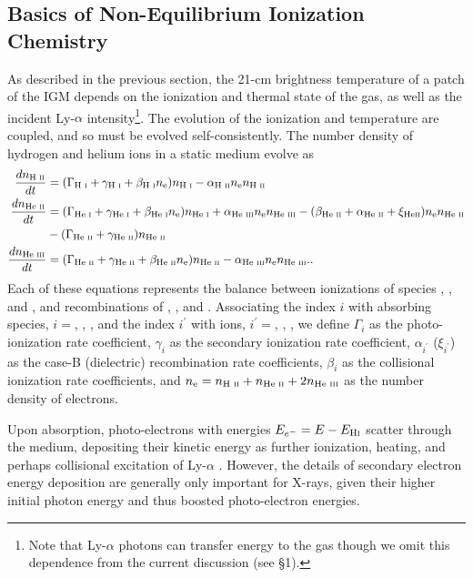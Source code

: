 \subsection{Basics of Non-Equilibrium Ionization Chemistry}
As described in the previous section, the 21-cm brightness temperature of a patch of the IGM depends on the ionization and thermal state of the gas, as well as the incident Ly-$\alpha$ intensity\footnote{Note that Ly-$\alpha$ photons can transfer energy to the gas though we omit this dependence from the current discussion (see \S1).}. The evolution of the ionization and temperature are coupled, and so must be evolved self-consistently. The number density of hydrogen and helium ions in a static medium evolve as
\begin{align}
    \frac{d n_{\text{H } \textsc{ii}}}{dt} & = (\Gamma_{\text{H } \textsc{i}} + \gamma_{\text{H } \textsc{i}} + \beta_{\text{H } \textsc{i}} n_{\text{e}}) n_{\text{H } \textsc{i}} - \alpha_{\text{H } \textsc{ii}} n_{\text{e}} n_{\text{H } \textsc{ii}}   \label{eq:HIIRateEquation} \\
    \frac{d n_{\text{He } \textsc{ii}}}{dt} & = (\Gamma_{\text{He } \textsc{i}} + \gamma_{\text{He } \textsc{i}} + \beta_{\text{He } \textsc{i}} n_{\text{e}}) n_{\text{He } \textsc{i}} \nonumber + \alpha_{\text{He } \textsc{iii}} n_{\text{e}} n_{\text{He } \textsc{iii}}  - (\beta_{\text{He } \textsc{ii}} + \alpha_{\text{He } \textsc{ii}} + \xi_{\text{He} \textsc{ii}}) n_{\text{e}} n_{\text{He } \textsc{ii}} \\ & - (\Gamma_{\text{He } \textsc{ii}} + \gamma_{\text{He } \textsc{ii}}) n_{\text{He } \textsc{ii}} \label{eq:HeIIRateEquation} \\ 
    \frac{d n_{\text{He } \textsc{iii}}}{dt} & = (\Gamma_{\text{He } \textsc{ii}} + \gamma_{\text{He } \textsc{ii}} + \beta_{\text{He } \textsc{ii}} n_{\text{e}}) n_{\text{He } \textsc{ii}}  - \alpha_{\text{He } \textsc{iii}} n_{\text{e}} n_{\text{He } \textsc{iii}} . \label{eq:HeIIIRateEquation} .
\end{align}
Each of these equations represents the balance between ionizations of species
\HI, \HeI, and \HeII, and recombinations of \HII, \HeII, and
\HeIII. Associating the index $i$ with absorbing species, $i = $\HI, \HeI,
\HeII, and the index $i^{\prime}$ with ions, $i^{\prime} = $\HII, \HeII,
\HeIII, we define $\Gamma_i$ as the photo-ionization rate coefficient,
$\gamma_i$ as the secondary ionization rate coefficient, $\alpha_{i^{\prime}}$
($\xi_{i^{\prime}}$) as the case-B (dielectric) recombination rate
coefficients, $\beta_i$ as the collisional ionization rate coefficients, and
$n_{\text{e}} = n_{\text{H } \textsc{ii}} + n_{\text{He } \textsc{ii}} + 2n_{\text{He } \textsc{iii}}$ as the number density of electrons.

Upon absorption, photo-electrons with energies $E_{e^-} = E - E_{\text{H} {\textsc{i}}}$ scatter through the medium, depositing their kinetic energy as further ionization, heating, and perhaps collisional excitation of Ly-$\alpha$ \cite{Shull1979,Shull1985,Furlanetto2010}. However, the details of secondary electron energy deposition are generally only important for X-rays, given their higher initial photon energy and thus boosted photo-electron energies.


